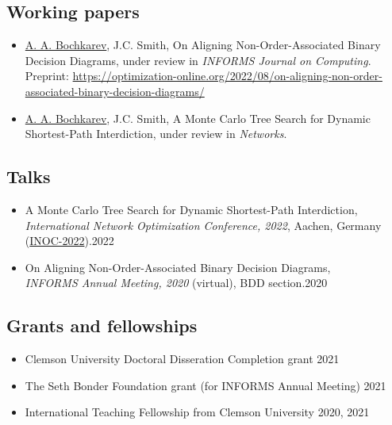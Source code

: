 \documentclass[11pt, a4paper]{article} \usepackage{geometry} %
\begin{document}
 \subsection*{Working papers}
 \begin{itemize}
    \itemsep0pt
    \item \underline{A. A. Bochkarev}, J.C. Smith, On Aligning
    Non-Order-Associated Binary Decision Diagrams, under review in
    \textit{INFORMS Journal on Computing}. Preprint: \href{https://optimization-online.org/2022/08/on-aligning-non-order-associated-binary-decision-diagrams/}{https://optimization-online.org/2022/08/on-aligning-non-order-associated-binary-decision-diagrams/}
  \item \underline{A. A. Bochkarev}, J.C. Smith, A Monte Carlo Tree Search for
    Dynamic Shortest-Path Interdiction, under review in \textit{Networks}.
 \end{itemize}

 \subsection*{Talks}
 \begin{itemize}
   \itemsep0pt
 \item A Monte Carlo Tree Search for Dynamic Shortest-Path Interdiction,\\
   \textit{International Network Optimization Conference, 2022}, Aachen,
   Germany
   (\href{https://sites.google.com/view/inoc2022/schedule}{INOC-2022}).\hfill 2022
 \item On Aligning Non-Order-Associated Binary Decision Diagrams,\\\textit{INFORMS Annual
     Meeting, 2020} (virtual), BDD section.\hfill 2020
 \end{itemize}

 \subsection*{Grants and fellowships}
 \begin{itemize}
 \itemsep0pt
    \item Clemson University Doctoral Disseration Completion grant \hfill 2021
    \item The Seth Bonder Foundation grant (for INFORMS Annual Meeting)\hfill
      2021
    \item International Teaching Fellowship from Clemson University \hfill 2020, 2021
 \end{itemize}
\end{document}
